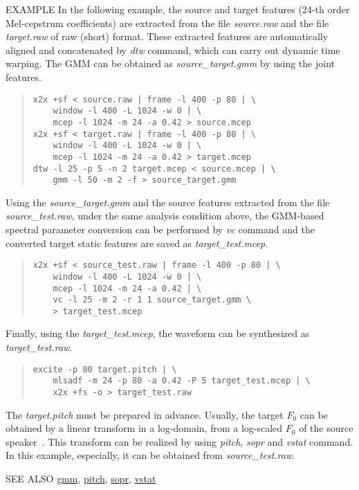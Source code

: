 \begin{qsection}{EXAMPLE}
In the following example, the source and target features (24-th order Mel-cepstrum
coefficients) are extracted from the file {\em source.raw} and the file {\em
target.raw} of raw (short) format.  These extracted features are automatically
aligned and concatenated by {\em dtw} command, which can carry out dynamic time
warping.  The GMM can be obtained as {\em source\_target.gmm} by using the joint
features.
\begin{quote}
\verb!x2x +sf < source.raw | frame -l 400 -p 80 | \! \\
\verb!    window -l 400 -L 1024 -w 0 | \! \\
\verb!    mcep -l 1024 -m 24 -a 0.42 > source.mcep ! \\
\verb!x2x +sf < target.raw | frame -l 400 -p 80 | \! \\
\verb!    window -l 400 -L 1024 -w 0 | \! \\
\verb!    mcep -l 1024 -m 24 -a 0.42 > target.mcep ! \\
\verb!dtw -l 25 -p 5 -n 2 target.mcep < source.mcep | \! \\
\verb!    gmm -l 50 -m 2 -f > source_target.gmm!
\end{quote}
Using the {\em source\_target.gmm} and the source features extracted from the file
{\em source\_test.raw}, under the same analysis condition above, the GMM-based
spectral parameter conversion can be performed by {\em vc} command and the converted
target static features are saved as {\em target\_test.mcep}.
\begin{quote}
\verb!x2x +sf < source_test.raw | frame -l 400 -p 80 | \! \\
\verb!    window -l 400 -L 1024 -w 0 | \! \\
\verb!    mcep -l 1024 -m 24 -a 0.42 | \! \\
\verb!    vc -l 25 -m 2 -r 1 1 source_target.gmm \! \\
\verb!    > target_test.mcep!
\end{quote}
Finally, using the {\em target\_test.mcep}, the waveform can be synthesized as {\em
 target\_test.raw}.
\begin{quote}
\verb!excite -p 80 target.pitch | \! \\
\verb!    mlsadf -m 24 -p 80 -a 0.42 -P 5 target_test.mcep | \! \\
\verb!    x2x +fs -o > target_test.raw!
\end{quote}
The {\em target.pitch} must be prepared in advance.  Usually, the target $F_0$ can be
obtained by a linear transform in a log-domain, from a log-scaled $F_0$ of the source
speaker~\cite{ref:vc-IEEETASLP}.  This transform can be realized by using {\em
pitch}, {\em sopr} and {\em vstat} command.  In this example, especially, it can be
obtained from {\em source\_test.raw}.
\end{qsection}

\begin{qsection}{SEE ALSO}
\hyperlink{gmm}{gmm},
\hyperlink{pitch}{pitch},
\hyperlink{sopr}{sopr},
\hyperlink{vstat}{vstat}
\end{qsection}
